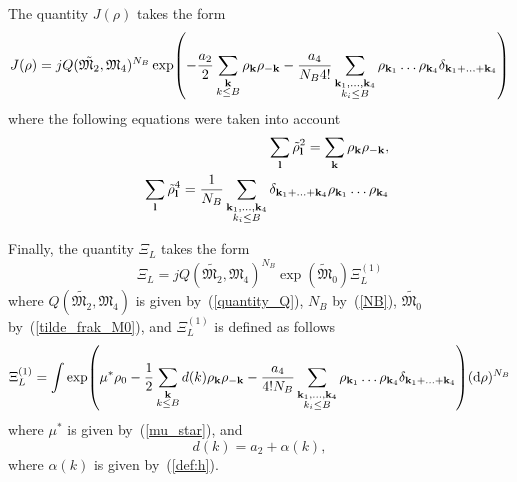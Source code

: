 The quantity $J(\rho)$ takes the form
\begin{equation}
	J(\rho) = j Q(\tilde{\mathfrak{M}_2}, \mathfrak{M}_4)^{N_B}
	\exp(-\frac{a_2}{2}\sum_{\substack{\vb k \\ k \leq B}} \rho_{\vb k}\rho_{-{\vb k}} 
	- \frac{a_4}{N_B 4!} \sum_{\substack{\vb k_1, \dotsc, \vb k_4 \\ k_i \leq B}} \rho_{\vb k_1} \dotsc \rho_{\vb k_4} \delta_{\vb{k}_1 + \dotsc + \vb{k}_4} )
\end{equation}
where the following equations were taken into account
\begin{eqnarray}
	&&\sum_{\vb l}\tilde{\rho}_{\vb l}^2 = \sum_{\vb k}\rho_{\vb k} \rho_{-\vb k},
	\\
	&&\sum_{\vb l}\tilde{\rho}_{\vb l}^4 = \frac{1}{N_B}\sum\limits_{\substack{\vb{k}_1,\dotsc,\vb{k}_4 \\ {k_i \le B}}}
	\delta_{\vb{k}_1 + \dotsc + \vb{k}_4} 
	\rho_{{\vb k}_1} \dots \rho_{{\vb k}_4}
\end{eqnarray}

Finally, the quantity $\Xi_L$ takes the form
\begin{equation}
	\Xi_L = jQ(\tilde{\mathfrak{M}_2}, \mathfrak{M}_4)^{N_B} \exp(\tilde{\mathfrak{M}}_0) \Xi_L^{(1)}
\end{equation}
where $Q(\tilde{\mathfrak{M}_2}, \mathfrak{M}_4)$ is given by~(\ref{quantity_Q}), $N_B$ by~(\ref{NB}), $\tilde{\mathfrak{M}_0}$ by~(\ref{tilde_frak_M0}), and $\Xi_L^{(1)}$ is defined as follows
\begin{equation}
	\label{Xi_L}
	\Xi_L^{(1)} = \int \exp(\mu^* \rho_0 - \frac{1}{2} \sum_{\substack{\vb k \\ k \leq B}} d(k) \rho_{\vb k} \rho_{-\vb k} - \frac{a_4}{4! N_B} \sum_{\substack{\vb k_1, \dotsc, \vb k_4 \\ k_i \leq B}} \rho_{\vb k_1} \dotsc \rho_{\vb k_4} \delta_{\vb{k}_1 + \dotsc + \vb{k}_4} ) ({\rm d} \rho)^{N_B}
\end{equation}
where $\mu^*$ is given by~(\ref{mu_star}), and 
\begin{equation}
	d(k) = a_2 + \alpha(k),
\end{equation}
where $\alpha(k)$ is given by~(\ref{def:h}).

